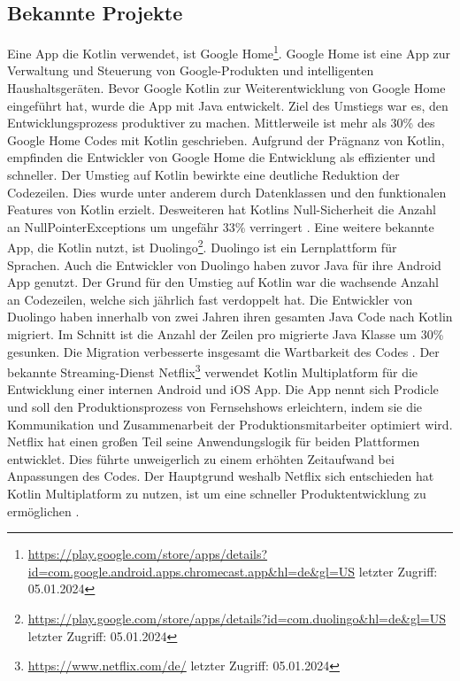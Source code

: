 \documentclass{article}
\begin{document}
\subsection{Bekannte Projekte}
Eine App die Kotlin verwendet, ist Google Home\footnote{\url{https://play.google.com/store/apps/details?id=com.google.android.apps.chromecast.app&hl=de&gl=US} letzter Zugriff: 05.01.2024}. Google Home ist eine App zur Verwaltung und Steuerung von Google-Produkten und intelligenten Haushaltsgeräten. Bevor Google Kotlin zur Weiterentwicklung von Google Home eingeführt hat, wurde die App mit Java entwickelt. Ziel des Umstiegs war es, den Entwicklungsprozess produktiver zu machen. Mittlerweile ist mehr als 30\% des Google Home Codes mit Kotlin geschrieben. Aufgrund der Prägnanz von Kotlin, empfinden die Entwickler von Google Home die Entwicklung als effizienter und schneller. Der Umstieg auf Kotlin bewirkte eine deutliche Reduktion der Codezeilen. Dies wurde unter anderem durch Datenklassen und den funktionalen Features von Kotlin erzielt. Desweiteren hat Kotlins Null-Sicherheit die Anzahl an NullPointerExceptions um ungefähr 33\% verringert \cite{GoogleHome}.
\newline
Eine weitere bekannte App, die Kotlin nutzt, ist Duolingo\footnote{\url{https://play.google.com/store/apps/details?id=com.duolingo&hl=de&gl=US} letzter Zugriff: 05.01.2024}. Duolingo ist ein Lernplattform für Sprachen. Auch die Entwickler von Duolingo haben zuvor Java für ihre Android App genutzt. Der Grund für den Umstieg auf Kotlin war die wachsende Anzahl an Codezeilen, welche sich jährlich fast verdoppelt hat. Die Entwickler von Duolingo haben innerhalb von zwei Jahren ihren gesamten Java Code nach Kotlin migriert. Im Schnitt ist die Anzahl der Zeilen pro migrierte Java Klasse um 30\% gesunken. Die Migration verbesserte insgesamt die Wartbarkeit des Codes \cite{Duolingo}. \newline
Der bekannte Streaming-Dienst Netflix\footnote{\url{https://www.netflix.com/de/} letzter Zugriff: 05.01.2024} verwendet Kotlin Multiplatform für die Entwicklung einer internen Android und iOS App. Die App nennt sich Prodicle und soll den Produktionsprozess von Fernsehshows erleichtern, indem sie die Kommunikation und Zusammenarbeit der Produktionsmitarbeiter optimiert wird. Netflix hat einen großen Teil seine Anwendungslogik für beiden Plattformen entwicklet. Dies führte unweigerlich zu einem erhöhten Zeitaufwand bei Anpassungen des Codes. Der Hauptgrund weshalb Netflix sich entschieden hat Kotlin Multiplatform zu nutzen, ist um eine schneller Produktentwicklung zu ermöglichen \cite{Netflx}.
\end{document}
